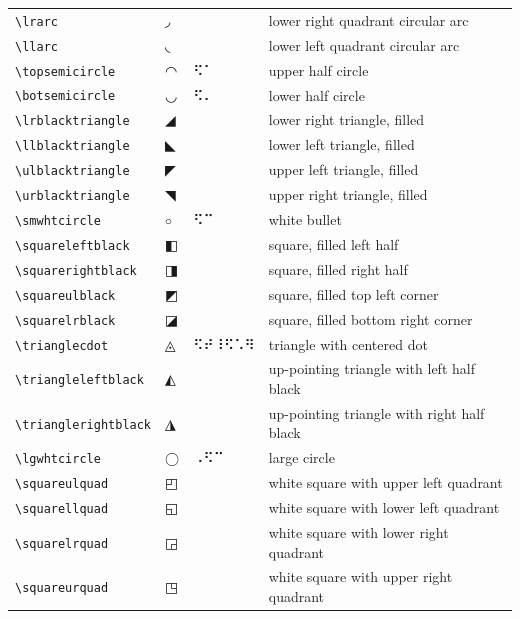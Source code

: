 \documentclass[oneside]{article}
\begin{document}
\begin{longtable}{llll}
\verb|\lrarc| & $\lrarc$ &    & {lower right quadrant circular arc} \\[2ex]
\verb|\llarc| & $\llarc$ &    & {lower left quadrant circular arc} \\[2ex]
\verb|\topsemicircle| & $\topsemicircle$ &  ⠫⠁  & {upper half circle} \\[2ex]
\verb|\botsemicircle| & $\botsemicircle$ &  ⠫⠄  & {lower half circle} \\[2ex]
\verb|\lrblacktriangle| & $\lrblacktriangle$ &    & {lower right triangle, filled} \\[2ex]
\verb|\llblacktriangle| & $\llblacktriangle$ &    & {lower left triangle, filled} \\[2ex]
\verb|\ulblacktriangle| & $\ulblacktriangle$ &    & {upper left triangle, filled} \\[2ex]
\verb|\urblacktriangle| & $\urblacktriangle$ &    & {upper right triangle, filled} \\[2ex]
\verb|\smwhtcircle| & $\smwhtcircle$ &  ⠫⠉  & {white bullet} \\[2ex]
\verb|\squareleftblack| & $\squareleftblack$ &    & {square, filled left half} \\[2ex]
\verb|\squarerightblack| & $\squarerightblack$ &    & {square, filled right half} \\[2ex]
\verb|\squareulblack| & $\squareulblack$ &    & {square, filled top left corner} \\[2ex]
\verb|\squarelrblack| & $\squarelrblack$ &    & {square, filled bottom right corner} \\[2ex]
\verb|\trianglecdot| & $\trianglecdot$ &  ⠫⠞⠸⠫⠡⠻  & {triangle with centered dot} \\[2ex]
\verb|\triangleleftblack| & $\triangleleftblack$ &    & {up-pointing triangle with left half black} \\[2ex]
\verb|\trianglerightblack| & $\trianglerightblack$ &    & {up-pointing triangle with right half black} \\[2ex]
\verb|\lgwhtcircle| & $\lgwhtcircle$ &  ⠠⠫⠉  & {large circle} \\[2ex]
\verb|\squareulquad| & $\squareulquad$ &    & {white square with upper left quadrant} \\[2ex]
\verb|\squarellquad| & $\squarellquad$ &    & {white square with lower left quadrant} \\[2ex]
\verb|\squarelrquad| & $\squarelrquad$ &    & {white square with lower right quadrant} \\[2ex]
\verb|\squareurquad| & $\squareurquad$ &    & {white square with upper right quadrant} \\[2ex]

\end{longtable}
\end{document}
